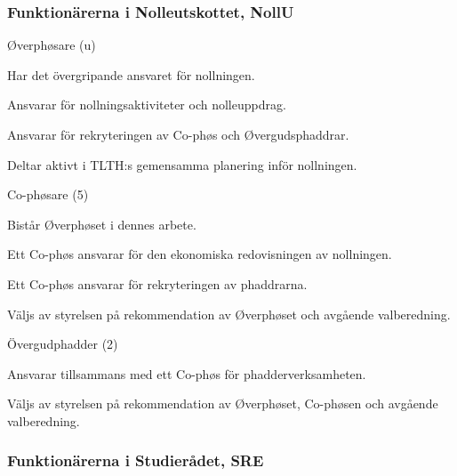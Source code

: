 \documentclass[10pt]{article}
\begin{document}
\subsubsection{Funktionärerna i Nolleutskottet, NollU}

\begin{emptylist}
    \item Øverphøsare (u)
        \begin{dashlist}
            \item Har det övergripande ansvaret för nollningen.
            \item Ansvarar för nollningsaktiviteter och nolleuppdrag.
            \item Ansvarar för rekryteringen av Co-phøs och Øvergudsphaddrar.
            \item Deltar aktivt i TLTH:s gemensamma planering inför nollningen.
        \end{dashlist}
    \item Co-phøsare (5)
        \begin{dashlist}
          \item Bistår Øverphøset i dennes arbete.
          \item Ett Co-phøs ansvarar för den ekonomiska redovisningen av nollningen.
          \item Ett Co-phøs ansvarar för rekryteringen av phaddrarna.
          \item Väljs av styrelsen på rekommendation av Øverphøset och avgående valberedning.
        \end{dashlist}
    \item Övergudphadder (2)
        \begin{dashlist}
          \item Ansvarar tillsammans med ett Co-phøs för phadderverksamheten.
          \item Väljs av styrelsen på rekommendation av Øverphøset, Co-phøsen och avgående
          valberedning.
        \end{dashlist}
\end{emptylist}
\subsubsection{Funktionärerna i Studierådet, SRE}
\end{document}
